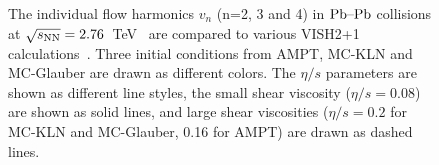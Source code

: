 \begin{figure}[h]
\begin{center}
        \caption{The individual flow harmonics $v_n$ (n=2, 3 and 4) in $\textnormal{Pb--Pb}$ collisions at $\sqrt{s_{\textnormal{NN}}}=2.76$~TeV~\cite{Adam:2016izf} are compared to various VISH2+1 calculations~\cite{Zhu:2016puf}. Three initial conditions from AMPT, MC-KLN and MC-Glauber are drawn as different colors. The $\eta/s$ parameters are shown as different line styles, the small shear viscosity ($\eta/s=0.08$) are shown as solid lines, and large shear viscosities ($\eta/s=0.2$ for MC-KLN and MC-Glauber, 0.16 for AMPT) are drawn as dashed lines.}
        \label{fig:Figure_A2}
              \end{center}
\end{figure}

